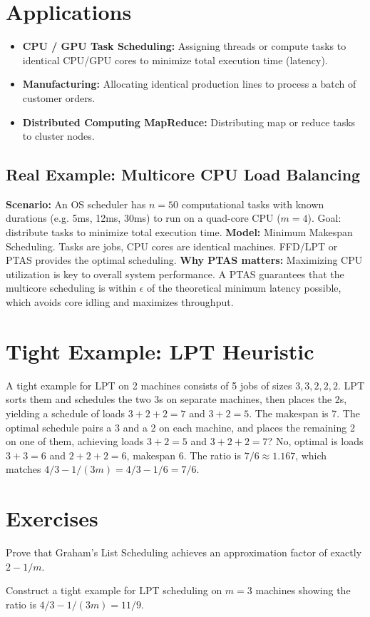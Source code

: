 \section{Applications}
\begin{itemize}
    \item \textbf{CPU / GPU Task Scheduling:} Assigning threads or compute tasks to identical CPU/GPU cores to minimize total execution time (latency).
    \item \textbf{Manufacturing:} Allocating identical production lines to process a batch of customer orders.
    \item \textbf{Distributed Computing MapReduce:} Distributing map or reduce tasks to cluster nodes.
\end{itemize}

\subsection*{Real Example: Multicore CPU Load Balancing}
\textbf{Scenario:} An OS scheduler has $n=50$ computational tasks with known durations (e.g. 5ms, 12ms, 30ms) to run on a quad-core CPU ($m=4$). Goal: distribute tasks to minimize total execution time.
\textbf{Model:} Minimum Makespan Scheduling. Tasks are jobs, CPU cores are identical machines. FFD/LPT or PTAS provides the optimal scheduling.
\textbf{Why PTAS matters:} Maximizing CPU utilization is key to overall system performance. A PTAS guarantees that the multicore scheduling is within $\epsilon$ of the theoretical minimum latency possible, which avoids core idling and maximizes throughput.

\section{Tight Example: LPT Heuristic}
A tight example for LPT on 2 machines consists of 5 jobs of sizes $3, 3, 2, 2, 2$. LPT sorts them and schedules the two 3s on separate machines, then places the 2s, yielding a schedule of loads $3+2+2 = 7$ and $3+2 = 5$. The makespan is 7. The optimal schedule pairs a 3 and a 2 on each machine, and places the remaining 2 on one of them, achieving loads $3+2 = 5$ and $3+2+2 = 7$? No, optimal is loads $3+3 = 6$ and $2+2+2 = 6$, makespan 6. The ratio is $7/6 \approx 1.167$, which matches $4/3 - 1/(3m) = 4/3 - 1/6 = 7/6$.

\section{Exercises}
\begin{exercise}
Prove that Graham's List Scheduling achieves an approximation factor of exactly $2 - 1/m$.
\end{exercise}
\begin{exercise}
Construct a tight example for LPT scheduling on $m=3$ machines showing the ratio is $4/3 - 1/(3m) = 11/9$.
\end{exercise}

